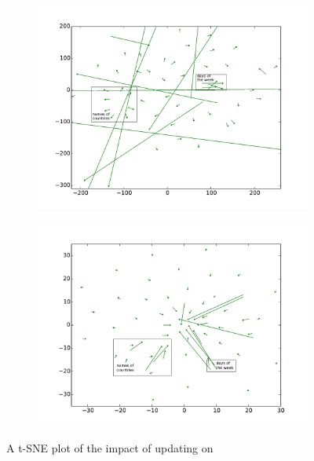 \begin{figure}[t!]
\centering
\begin{subfigure}[b]{0.48\textwidth}
	\centering
    \includegraphics[width=\textwidth]{lizhenskipchunking}
	\subcaption{\chunking}	
	\label{fig:skipChu}
\end{subfigure}
\begin{subfigure}[b]{0.48\textwidth}
	\centering
    \includegraphics[width=\textwidth]{lizhenskipner}    	
	\subcaption{\ner}
	\label{fig:skippos}	
\end{subfigure}
\caption{A t-SNE plot of the impact of updating on \Skipgram}
\label{fig:vectorfield}
\end{figure}


